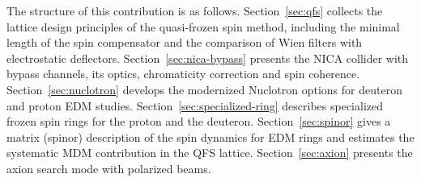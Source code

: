 The structure of this contribution is as follows. Section~\ref{sec:qfs}
collects the lattice design principles of the quasi-frozen spin method,
including the minimal length of the spin compensator and the comparison of
Wien filters with electrostatic deflectors. Section~\ref{sec:nica-bypass}
presents the NICA collider with bypass channels, its optics, chromaticity
correction and spin coherence. Section~\ref{sec:nuclotron} develops the
modernized Nuclotron options for deuteron and proton EDM studies.
Section~\ref{sec:specialized-ring} describes specialized frozen spin rings for
the proton and the deuteron. Section~\ref{sec:spinor} gives a matrix
(spinor) description of the spin dynamics for EDM rings and estimates the
systematic MDM contribution in the QFS lattice. Section~\ref{sec:axion}
presents the axion search mode with polarized beams.

